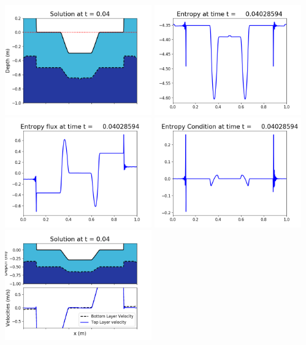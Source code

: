 \documentclass[11pt]{article}
\begin{document}
\includegraphics[width=0.475\textwidth]{frame0093fig1006.png}
\vskip 10pt 
\includegraphics[width=0.475\textwidth]{frame0093fig1007.png}
\includegraphics[width=0.475\textwidth]{frame0093fig1008.png}
\vskip 10pt 
\includegraphics[width=0.475\textwidth]{frame0093fig1009.png}
\vskip 10pt 
\includegraphics[width=0.475\textwidth]{frame0094fig1001.png}
\end{document}

